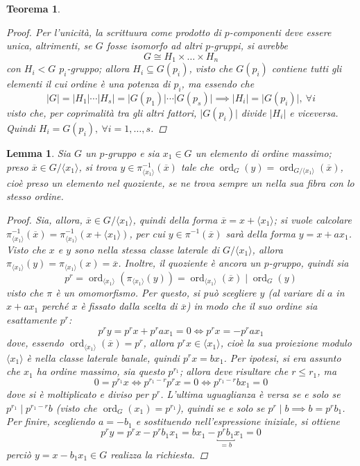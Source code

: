 \documentclass[11pt]{scrartcl}
\theoremstyle{style1}
\newtheorem{teorema}{Teorema}[section]
\newtheorem{lemma}{Lemma}[teorema]
\numberwithin{equation}{subsection}
\begin{document}
\begin{teorema}
\begin{proof}
		Per l'unicit\`a, la scrittuura come prodotto di $p$-componenti deve essere unica, altrimenti, se $G$ fosse isomorfo ad altri $p$-gruppi, si avrebbe
		\[
		G \cong H_1\times \ldots\times H_n
		\] 
		con $H_i<G$ $p_i$-gruppo; allora $H_i \subseteq G(p_i)$, visto che $G(p_i)$ contiene tutti gli elementi il cui ordine \`e una potenza di $p_i$, ma essendo che
		\[
		\lvert G \rvert =\lvert H_1 \rvert \cdots \lvert H_s \rvert = \lvert G(p_1) \rvert \cdots\lvert G(p_s) \rvert \implies \lvert H_i \rvert =\lvert G(p_i) \rvert , \ \forall i
		\] 
		visto che, per coprimalit\`a tra gli altri fattori, $\lvert G(p_i) \rvert  $ divide $ \lvert H_i \rvert $ e viceversa. Quindi $H_i = G(p_i), \ \forall i = 1,\ldots,s$.
\end{proof}
\end{teorema}
\begin{lemma}
	Sia $G$ un $p$-gruppo e sia $x_1\in G$ un elemento di ordine massimo; preso $\overline{x} \in G / \langle x_1 \rangle$, si trova $y \in \pi^{-1}_{\langle x_1 \rangle} (\overline{x})$ tale che $\operatorname{ord}_G(y)= \operatorname{ord}_{G/\langle x_1 \rangle} ( \overline{x})  $, cio\`e preso un elemento nel quoziente, se ne trova sempre un nella sua fibra con lo stesso ordine.
	\begin{proof}
		Sia, allora, $\overline{x}\in G / \langle x_1 \rangle$, quindi della forma $\overline{x}= x + \langle x_1 \rangle$; si vuole calcolare $\pi^{-1}_{\langle x_1 \rangle} (\overline{x}) = \pi^{-1}_{\langle x_1 \rangle} (x+\langle x_1 \rangle)$, per cui $y  \in \pi^{-1}(\overline{x})$ sar\`a della forma $y = x + ax_1$.
		Visto che $x$ e $y$ sono nella stessa classe laterale di $G / \langle x_1 \rangle$, allora $\pi_{\langle x_1 \rangle} (y) = \pi_{\langle x_1 \rangle} (x)= \overline{x}$.
		Inoltre, il quoziente \`e ancora un $p$-gruppo, quindi sia
		\[
		p^r = \operatorname{ord}_{\langle x_1 \rangle} (\pi_{\langle x_1 \rangle} (y)) =\operatorname{ord}_{\langle x_1 \rangle} (\overline{x})  \mid \operatorname{ord}_G(y) 
		\] 
		visto che $\pi$ \`e un omomorfismo.
		Per questo, si pu\`o scegliere $y$ (al variare di $a$ in $x+ ax_1$ perch\'e $x$ \`e fissato dalla scelta di $\overline{x}$) in modo che il suo ordine sia esattamente $p^r$:
		\[
		p^r y = p^r x + p^r ax_1 = 0 \iff p^r x = - p^r ax_1
		\] 
		dove, essendo $\operatorname{ord}_{\langle x_1 \rangle} (\overline{x}) =p^r$, allora $p^r x \in \langle x_1 \rangle$, cio\`e la sua proiezione modulo $\langle x_1 \rangle$ \`e nella classe laterale banale, quindi $p^rx = bx_1$.
		Per ipotesi, si era assunto che $x_1$ ha ordine massimo, sia questo $p^{r_1} $; allora deve risultare che $r\le r_1$, ma 
		\[
		0 = p^{r_1} x \iff p^{r_1-r} p^r x = 0 \iff p^{r_1-r} bx_1=0
		\] 
		dove si \`e moltiplicato e diviso per $p^r$. 
		L'ultima uguaglianza \`e versa se e solo se $p^{r_1}  \mid p^{r_1-r} b$ (visto che $\operatorname{ord}_G(x_1) =p^{r_1} $), quindi se e solo se $p^r  \mid b \implies b = p^r b_1$.
		Per finire, scegliendo $a = -b_1$  e sostituendo nell'espressione iniziale, si ottiene 
		\[
			p^r y = p^r x - p^r b_1x_1=bx_1 - \underbracket{p^r b_1}_{=b}  x_1 = 0
		\] 
		perci\`o $y= x - b_1 x_1 \in G$ realizza la richiesta.
	\end{proof}
\end{lemma}
\end{document}
